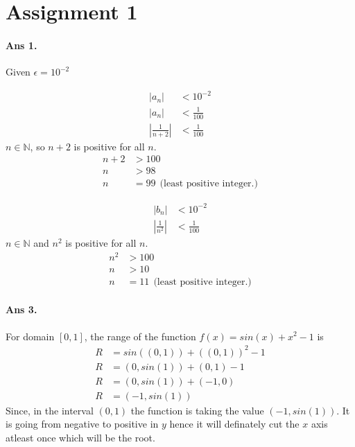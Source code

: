 \documentclass[12pt]{report}
\title{
\author{Devansh Tripathi\\ IMS22090\\ Lecturer: Dr. Asha K. Dond}
}
\begin{document}
\maketitle
\section*{Assignment 1}
\paragraph*{Ans 1.} Given $\epsilon = 10^{-2}$\\
\begin{minipage}{0.5\textwidth}
    \begin{align*}
        |a_n| &< 10^{-2}\\
        |a_n| &< \frac{1}{100}\\
        \left|\frac{1}{n+2}\right| &< \frac{1}{100}
    \end{align*}
    $n\in\mathbb{N}$, so $n+2$ is positive for all $n$.
    \begin{align*}
        n+2 &> 100\\
        n &> 98\\
        n &= 99 ~~\text{(least positive integer.)}
    \end{align*} 
\end{minipage}%
\begin{minipage}{0.5\textwidth}
    \begin{align*}
        |b_n| &< 10^{-2}\\
        \left|\frac{1}{n^2}\right| &< \frac{1}{100}
    \end{align*}
    $n\in \mathbb{N}$ and $n^2$ is positive for all $n$.
    \begin{align*}
        n^2 &> 100\\
        n &> 10\\
        n &= 11 ~~\text{(least positive integer.)}
    \end{align*}
\end{minipage}
\paragraph*{Ans 3.} For domain $[0,1]$, the range of the function $f(x) = sin(x) + x^2 -1$ is
\begin{align*}
    R &= sin((0,1)) + ((0,1))^2 - 1\\
    R &= (0, sin(1)) + (0,1) -1 \\
    R &= (0, sin(1)) + (-1, 0)\\
    R &= (-1, sin(1))
\end{align*}
Since, in the interval $(0,1)$ the function is taking the value $(-1, sin(1))$. It is going from negative to positive in $y$ hence it will definately cut the $x$ axis atleast once which will be the root.
\end{document}
